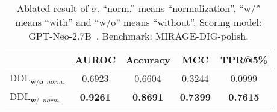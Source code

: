\begin{table}[htbp]
    \centering
    \caption{Ablated result of $\sigma$. ``norm.'' means ``normalization''. ``w/'' means ``with'' and ``w/o'' means ``without''. Scoring model: GPT-Neo-2.7B~\cite{gpt-neo}. Benchmark: MIRAGE-DIG-polish.}
    \begin{tabular}{l|cccc}
    \hline

    \hline

    \hline
         &  AUROC  &  Accuracy  &  MCC & TPR@5\%\\
    \hline
    DDL$_{\textbf{w/o}\enspace norm.}$ & 0.6923 & 0.6604 & 0.3244 & 0.0999\\
    \hdashline
    \rowcolor[HTML]{fff5f4}
    DDL$_{\textbf{w/}\enspace norm.}$& \textbf{0.9261} & \textbf{0.8691} & \textbf{0.7399} & \textbf{0.7615}\\
    \hline

    \hline

    \hline
    \end{tabular}
    \label{tab:ablation_normalization}
\end{table}